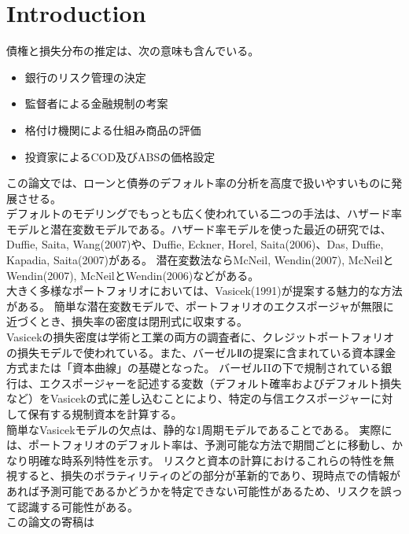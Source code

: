 \documentclass[a4j,12pt]{jarticle}
\begin{document}
\section{Introduction}
債権と損失分布の推定は、次の意味も含んでいる。
\begin{itemize}
\item 銀行のリスク管理の決定
\item 監督者による金融規制の考案
\item 格付け機関による仕組み商品の評価
\item 投資家によるCOD及びABSの価格設定
\end{itemize}
この論文では、ローンと債券のデフォルト率の分析を高度で扱いやすいものに発展させる。\\
\indent デフォルトのモデリングでもっとも広く使われている二つの手法は、ハザード率モデルと潜在変数モデルである。ハザード率モデルを使った最近の研究では、Duffie, Saita, Wang(2007)や、Duffie, Eckner, Horel, Saita(2006)、Das, Duffie, Kapadia, Saita(2007)がある。
潜在変数法ならMcNeil, Wendin(2007), McNeilとWendin(2007), McNeilとWendin(2006)などがある。\\
\indent 大きく多様なポートフォリオにおいては、Vasicek(1991)が提案する魅力的な方法がある。
簡単な潜在変数モデルで、ポートフォリオのエクスポージャが無限に近づくとき、損失率の密度は閉刑式に収束する。\\
\indent Vasicekの損失密度は学術と工業の両方の調査者に、クレジットポートフォリオの損失モデルで使われている。また、バーゼルⅡの提案に含まれている資本課金方式または「資本曲線」の基礎となった。
バーゼルIIの下で規制されている銀行は、エクスポージャーを記述する変数（デフォルト確率およびデフォルト損失など）をVasicekの式に差し込むことにより、特定の与信エクスポージャーに対して保有する規制資本を計算する。\\
\indent 簡単なVasicekモデルの欠点は、静的な1周期モデルであることである。
実際には、ポートフォリオのデフォルト率は、予測可能な方法で期間ごとに移動し、かなり明確な時系列特性を示す。
リスクと資本の計算におけるこれらの特性を無視すると、損失のボラティリティのどの部分が革新的であり、現時点での情報があれば予測可能であるかどうかを特定できない可能性があるため、リスクを誤って認識する可能性がある。\\
この論文の寄稿は
\end{document}
